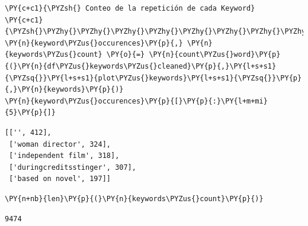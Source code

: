     \begin{tcolorbox}[breakable, size=fbox, boxrule=1pt, pad at break*=1mm,colback=cellbackground, colframe=cellborder]
\begin{Verbatim}[commandchars=\\\{\}]
\PY{c+c1}{\PYZsh{} Conteo de la repetición de cada Keyword}
\PY{c+c1}{\PYZsh{}\PYZhy{}\PYZhy{}\PYZhy{}\PYZhy{}\PYZhy{}\PYZhy{}\PYZhy{}\PYZhy{}\PYZhy{}\PYZhy{}\PYZhy{}\PYZhy{}\PYZhy{}\PYZhy{}\PYZhy{}\PYZhy{}\PYZhy{}\PYZhy{}\PYZhy{}\PYZhy{}\PYZhy{}\PYZhy{}\PYZhy{}\PYZhy{}\PYZhy{}\PYZhy{}\PYZhy{}\PYZhy{}\PYZhy{}\PYZhy{}\PYZhy{}\PYZhy{}\PYZhy{}\PYZhy{}}
\PY{n}{keyword\PYZus{}occurences}\PY{p}{,} \PY{n}{keywords\PYZus{}count} \PY{o}{=} \PY{n}{count\PYZus{}word}\PY{p}{(}\PY{n}{df\PYZus{}keywords\PYZus{}cleaned}\PY{p}{,}\PY{l+s+s1}{\PYZsq{}}\PY{l+s+s1}{plot\PYZus{}keywords}\PY{l+s+s1}{\PYZsq{}}\PY{p}{,}\PY{n}{keywords}\PY{p}{)}
\PY{n}{keyword\PYZus{}occurences}\PY{p}{[}\PY{p}{:}\PY{l+m+mi}{5}\PY{p}{]}
\end{Verbatim}
\end{tcolorbox}

            \begin{tcolorbox}[breakable, boxrule=.5pt, size=fbox, pad at break*=1mm, opacityfill=0]
\begin{Verbatim}[commandchars=\\\{\}]
[['', 412],
 ['woman director', 324],
 ['independent film', 318],
 ['duringcreditsstinger', 307],
 ['based on novel', 197]]
\end{Verbatim}
\end{tcolorbox}
        
    \begin{tcolorbox}[breakable, size=fbox, boxrule=1pt, pad at break*=1mm,colback=cellbackground, colframe=cellborder]
\begin{Verbatim}[commandchars=\\\{\}]
\PY{n+nb}{len}\PY{p}{(}\PY{n}{keywords\PYZus{}count}\PY{p}{)}
\end{Verbatim}
\end{tcolorbox}

            \begin{tcolorbox}[breakable, boxrule=.5pt, size=fbox, pad at break*=1mm, opacityfill=0]
\begin{Verbatim}[commandchars=\\\{\}]
9474
\end{Verbatim}
\end{tcolorbox}
        
